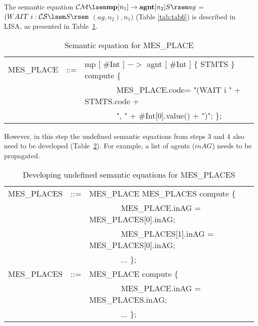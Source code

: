 \documentclass[preprint, prX]{revtex4}
\begin{document}
The semantic equation
$\mathcal{CM}\lsem \textbf{mp}[n_{1}]\rightarrow\textbf{agnt}[n_{2}] S \rsem ag$ = $(WAIT\ i:\mathcal{CS} \lsem S \rsem$ $(ag,n_{2}), n_{1})$ (Table \ref{tab:tab6}) is described in LISA, as presented in Table~\ref{tab:tab26}.

\begin{table}[htb]           \caption{Semantic equation for MES\_PLACE}
\label{tab:tab26}
\vspace{-5mm}
\footnotesize
\begin{center}
\begin{tabular}{ | l  l  l | }
\hline
MES\_PLACE & ::= & mp [ \#Int ] $->$  agnt [ \#Int ] \{ STMTS \} compute \{ \\
 & & \ \ \ \ \ \ \ \ MES\_PLACE.code= "(WAIT i " + STMTS.code + \\
 & & \ \ \ \ \ \ \ \ ", " + \#Int[0].value() + ")"; \}; \\
\hline
\end{tabular}
\end{center}
\normalsize
\vspace{-5mm}
\end{table}

However, in this step the undefined semantic equations from steps 3 and 4 also need to be developed (Table~\ref{tab:tab27}). For example, a list of agents ($inAG$) needs to be propagated.

\begin{table}[htb]           \caption{Developing undefined semantic equations for MES\_PLACES}
\label{tab:tab27}
\vspace{-5mm}
\footnotesize
\begin{center}
\begin{tabular}{ | l  l  l | }
\hline
MES\_PLACES & ::= & MES\_PLACE MES\_PLACES compute \{ \\
 & & \ \ \ \ \ \ \ \ MES\_PLACE.inAG = MES\_PLACES[0].inAG; \\
 & & \ \ \ \ \ \ \ \ MES\_PLACES[1].inAG = MES\_PLACES[0].inAG; \\
 & & \ \ \ \ \ \ \ \ ...  \}; \\
MES\_PLACES & ::= & MES\_PLACE compute \{ \\
 & & \ \ \ \ \ \ \ \ MES\_PLACE.inAG = MES\_PLACES.inAG; \\
 & & \ \ \ \ \ \ \ \ ... \}; \\
\hline
\end{tabular}
\end{center}
\normalsize
\vspace{-5mm}
\end{table}
\end{document}
